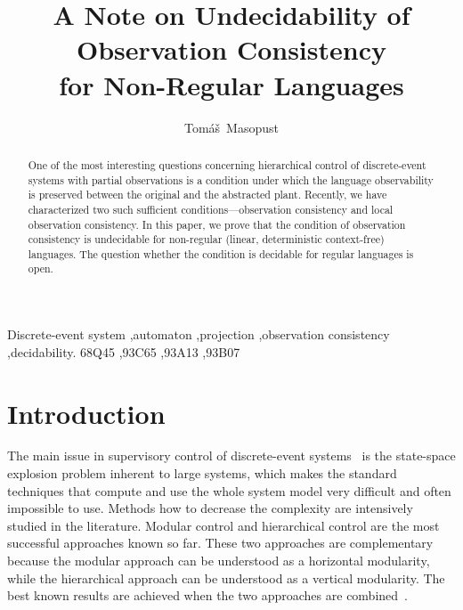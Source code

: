 \documentclass[preprint,1p,times]{elsarticle}
\begin{document}
\begin{frontmatter}

\title{A Note on Undecidability of Observation Consistency\\ for Non-Regular Languages}

\author{Tom{\' a}{\v s}~Masopust}
  \address{Institute of Mathematics, Academy of Sciences of the Czech Republic\\ {\v Z}i{\v z}kova 22, 616 62 Brno, Czech Republic}

\begin{abstract}
  One of the most interesting questions concerning hierarchical control of discrete-event systems with partial observations is a condition under which the language observability is preserved between the original and the abstracted plant. Recently, we have characterized two such sufficient conditions---observation consistency and local observation consistency. In this paper, we prove that the condition of observation consistency is undecidable for non-regular (linear, deterministic context-free) languages. The question whether the condition is decidable for regular languages is open.
\end{abstract}
\begin{keyword}
  Discrete-event system \sep automaton \sep projection \sep observation consistency \sep decidability.
  \MSC 68Q45 \sep 93C65 \sep 93A13 \sep 93B07
\end{keyword}
\end{frontmatter}


\section{Introduction}
  The main issue in supervisory control of discrete-event systems~\cite{CL08} is the state-space explosion problem inherent to large systems, which makes the standard techniques that compute and use the whole system model very difficult and often impossible to use. Methods how to decrease the complexity are intensively studied in the literature. Modular control and hierarchical control are the most successful approaches known so far. These two approaches are complementary because the modular approach can be understood as a horizontal modularity, while the hierarchical approach can be understood as a vertical modularity. The best known results are achieved when the two approaches are combined~\cite{KS}. 
  
\end{document}
